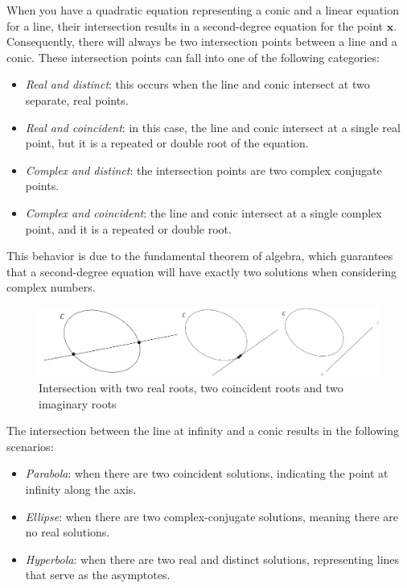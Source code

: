 When you have a quadratic equation representing a conic and a linear equation for a line, their intersection results in a second-degree equation for the point $\mathbf{x}$. 
Consequently, there will always be two intersection points between a line and a conic. 
These intersection points can fall into one of the following categories:
\begin{itemize}
    \item \textit{Real and distinct}: this occurs when the line and conic intersect at two separate, real points.
    \item \textit{Real and coincident}: in this case, the line and conic intersect at a single real point, but it is a repeated or double root of the equation.
    \item \textit{Complex and distinct}: the intersection points are two complex conjugate points.
    \item \textit{Complex and coincident}: the line and conic intersect at a single complex point, and it is a repeated or double root.
\end{itemize}
This behavior is due to the fundamental theorem of algebra, which guarantees that a second-degree equation will have exactly two solutions when considering complex numbers.
\begin{figure}[H]
    \centering
    \includegraphics[width=0.75\linewidth]{images/intersection.png}
    \caption{Intersection with two real roots, two coincident roots and two imaginary roots}
\end{figure}
The intersection between the line at infinity and a conic results in the following scenarios:
\begin{itemize}
    \item \textit{Parabola}: when there are two coincident solutions, indicating the point at infinity along the axis.
    \item \textit{Ellipse}: when there are two complex-conjugate solutions, meaning there are no real solutions.
    \item \textit{Hyperbola}: when there are two real and distinct solutions, representing lines that serve as the asymptotes.
\end{itemize}

